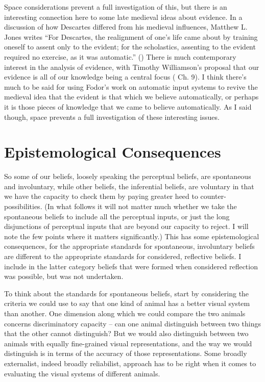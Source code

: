 \documentclass[
  11pt,
  letterpaper,
  DIV=11,
  numbers=noendperiod,
  oneside]{scrartcl}
\begin{document}
Space considerations prevent a full investigation of this, but there is
an interesting connection here to some late medieval ideas about
evidence. In a discussion of how Descartes differed from his medieval
influences, Matthew L. Jones writes ``For Descartes, the realignment of
one's life came about by training oneself to assent only to the evident;
for the scholastics, assenting to the evident required no exercise, as
it was automatic.''
() There is much contemporary
interest in the analysis of evidence, with Timothy Williamson's proposal
that our evidence is all of our knowledge being a central focus
( Ch. 9). I think
there's much to be said for using Fodor's work on automatic input
systems to revive the medieval idea that the evident is that which we
believe automatically, or perhaps it is those pieces of knowledge that
we came to believe automatically. As I said though, space prevents a
full investigation of these interesting issues.

\section{Epistemological
Consequences}\label{epistemological-consequences}

So some of our beliefs, loosely speaking the perceptual beliefs, are
spontaneous and involuntary, while other beliefs, the inferential
beliefs, are voluntary in that we have the capacity to check them by
paying greater heed to counter-possibilities. (In what follows it will
not matter much whether we take the spontaneous beliefs to include all
the perceptual inputs, or just the long disjunctions of perceptual
inputs that are beyond our capacity to reject. I will note the few
points where it matters significantly.) This has some epistemological
consequences, for the appropriate standards for spontaneous, involuntary
beliefs are different to the appropriate standards for considered,
reflective beliefs. I include in the latter category beliefs that were
formed when considered reflection was possible, but was not undertaken.

To think about the standards for spontaneous beliefs, start by
considering the criteria we could use to say that one kind of animal has
a better visual system than another. One dimension along which we could
compare the two animals concerns discriminatory capacity -- can one
animal distinguish between two things that the other cannot distinguish?
But we would also distinguish between two animals with equally
fine-grained visual representations, and the way we would distinguish is
in terms of the accuracy of those representations. Some broadly
externalist, indeed broadly reliabilist, approach has to be right when
it comes to evaluating the visual systems of different animals.
\end{document}
